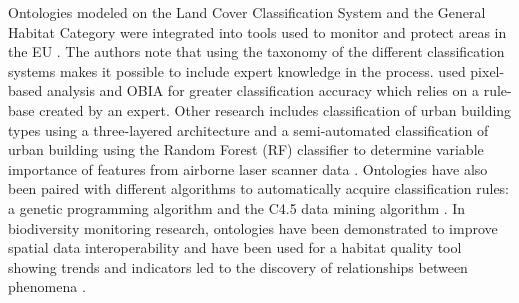 \documentclass[authoryear, review,12pt,number]{elsarticle}
\begin{document}
Ontologies modeled on the Land Cover Classification System and the General
Habitat Category were integrated into tools used to monitor and protect areas in
the EU \citep{Arvor2013}. The authors note that using the taxonomy of the
different classification systems makes it possible to include expert knowledge
in the process. \cite{Lucas2015} used pixel-based analysis and OBIA for greater
classification accuracy which relies on a rule-base created by an expert. Other
research includes classification of urban building types using a three-layered
architecture \citep{diSciascio2013} and a semi-automated classification of urban
building using the Random Forest (RF) classifier to determine variable
importance of features from airborne laser scanner data \citep{Belgiu2014}.
Ontologies have also been paired with different algorithms to automatically
acquire classification rules: a genetic programming algorithm
\citep{Forestier2012470} and the C4.5 data mining algorithm
\citep{Sheeren2006ML}. In biodiversity monitoring research, ontologies have been
demonstrated to improve spatial data interoperability \citep{Nieland2015,
Nieland2015a} and have been used for a habitat quality tool showing trends and indicators led to the discovery of relationships between phenomena \citep{Perez-Luque2015}. %
\end{document}
